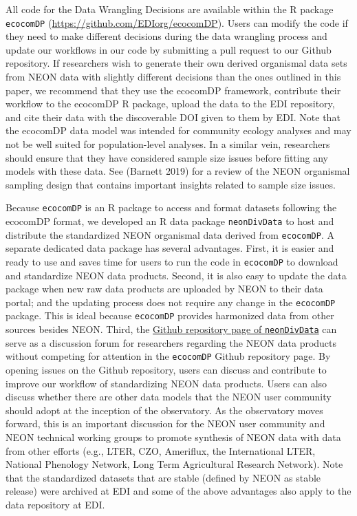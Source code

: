 \documentclass[
  12pt,
]{article}
\begin{document}
All code for the Data Wrangling Decisions are available within the R package \texttt{ecocomDP} (\url{https://github.com/EDIorg/ecocomDP}). Users can modify the code if they need to make different decisions during the data wrangling process and update our workflows in our code by submitting a pull request to our Github repository. If researchers wish to generate their own derived organismal data sets from NEON data with slightly different decisions than the ones outlined in this paper, we recommend that they use the ecocomDP framework, contribute their workflow to the ecocomDP R package, upload the data to the EDI repository, and cite their data with the discoverable DOI given to them by EDI. Note that the ecocomDP data model was intended for community ecology analyses and may not be well suited for population-level analyses. In a similar vein, researchers should ensure that they have considered sample size issues before fitting any models with these data. See (Barnett 2019) for a review of the NEON organismal sampling design that contains important insights related to sample size issues.

Because \texttt{ecocomDP} is an R package to access and format datasets following the ecocomDP format, we developed an R data package \texttt{neonDivData} to host and distribute the standardized NEON organismal data derived from \texttt{ecocomDP}. A separate dedicated data package has several advantages. First, it is easier and ready to use and saves time for users to run the code in \texttt{ecocomDP} to download and standardize NEON data products. Second, it is also easy to update the data package when new raw data products are uploaded by NEON to their data portal; and the updating process does not require any change in the \texttt{ecocomDP} package. This is ideal because \texttt{ecocomDP} provides harmonized data from other sources besides NEON. Third, the \href{(https://github.com/daijiang/neonDivData)}{Github repository page of \texttt{neonDivData}} can serve as a discussion forum for researchers regarding the NEON data products without competing for attention in the \texttt{ecocomDP} Github repository page. By opening issues on the Github repository, users can discuss and contribute to improve our workflow of standardizing NEON data products. Users can also discuss whether there are other data models that the NEON user community should adopt at the inception of the observatory. As the observatory moves forward, this is an important discussion for the NEON user community and NEON technical working groups to promote synthesis of NEON data with data from other efforts (e.g., LTER, CZO, Ameriflux, the International LTER, National Phenology Network, Long Term Agricultural Research Network). Note that the standardized datasets that are stable (defined by NEON as stable release) were archived at EDI and some of the above advantages also apply to the data repository at EDI.
\end{document}
